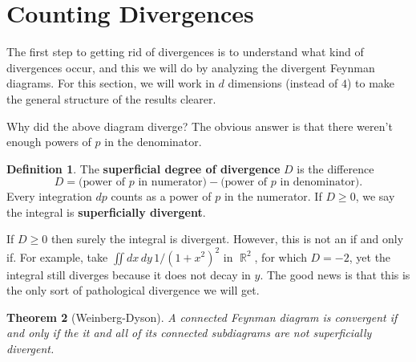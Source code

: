 \documentclass{report}
\theoremstyle{plain}
\newtheorem{theorem}{Theorem}[section]
\theoremstyle{definition}
\newtheorem{definition}[theorem]{Definition}
\theoremstyle{remark}
\DeclareMathOperator{\bR}{\mathbb{R}}
\begin{document}
\section{Counting Divergences}

The first step to getting rid of divergences is to understand what
kind of divergences occur, and this we will do by analyzing the
divergent Feynman diagrams. For this section, we will work in $d$
dimensions (instead of $4$) to make the general structure of the
results clearer.

Why did the above diagram diverge? The obvious answer is that there
weren't enough powers of $p$ in the denominator.

\begin{definition}
  The {\bf superficial degree of divergence} $D$ is the difference
  $$ D = \text{(power of } p \text{ in numerator)} - \text{(power of } p \text{ in denominator)}. $$
  Every integration $dp$ counts as a power of $p$ in the numerator. If
  $D \ge 0$, we say the integral is {\bf superficially divergent}.
\end{definition}

If $D \ge 0$ then surely the integral is divergent. However, this is
not an if and only if. For example, take
$\iint dx \, dy \, 1/(1 + x^2)^2$ in $\bR^2$, for which $D = -2$, yet
the integral still diverges because it does not decay in $y$. The good
news is that this is the only sort of pathological divergence we will
get.

\begin{theorem}[Weinberg-Dyson]
  A connected Feynman diagram is convergent if and only if the it and
  all of its connected subdiagrams are not superficially divergent.
\end{theorem}
\end{document}
